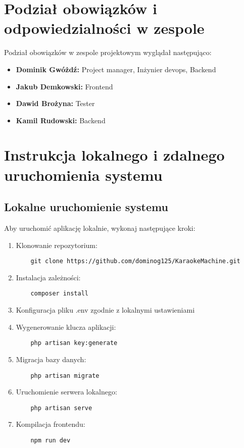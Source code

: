 \documentclass[a4paper,12pt]{article}
\begin{document}
\section{Podział obowiązków i odpowiedzialności w zespole}
Podział obowiązków w zespole projektowym wyglądał następująco:
\begin{itemize}
    \item \textbf{Dominik Gwóżdź:} Project manager, Inżynier devops,  Backend
    \item \textbf{Jakub Demkowski:} Frontend
    \item \textbf{Dawid Brożyna:} Tester
    \item \textbf{Kamil Rudowski:} Backend
\end{itemize}

\section{Instrukcja lokalnego i zdalnego uruchomienia systemu}
\subsection{Lokalne uruchomienie systemu}
Aby uruchomić aplikację lokalnie, wykonaj następujące kroki:
\begin{enumerate}
    \item Klonowanie repozytorium:
    \begin{verbatim}
    git clone https://github.com/dominog125/KaraokeMachine.git
    \end{verbatim}
    \item Instalacja zależności:
    \begin{verbatim}
    composer install
    \end{verbatim}
    \item Konfiguracja pliku .env zgodnie z lokalnymi ustawieniami
    \item Wygenerowanie klucza aplikacji:
    \begin{verbatim}
    php artisan key:generate
    \end{verbatim}
    \item Migracja bazy danych:
    \begin{verbatim}
    php artisan migrate
    \end{verbatim}
    \item Uruchomienie serwera lokalnego:
    \begin{verbatim}
    php artisan serve
    \end{verbatim}
    \item Kompilacja frontendu:
    \begin{verbatim}
    npm run dev
    \end{verbatim}
\end{enumerate}
\end{document}
